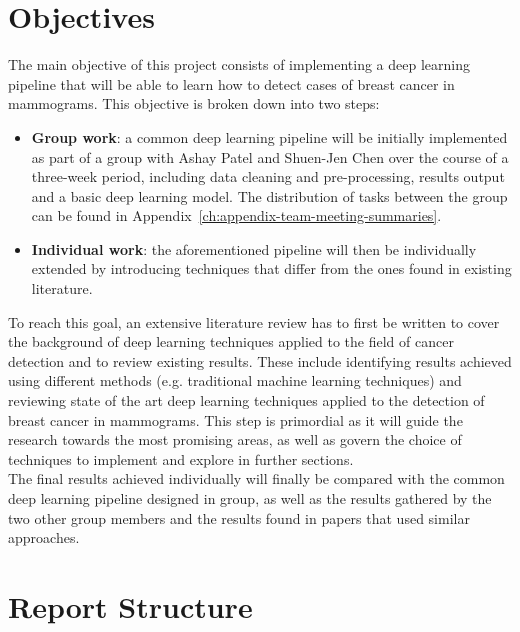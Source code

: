 
\section{Objectives}
\label{sec:introduction-objectives}

The main objective of this project consists of implementing a deep learning pipeline that will be able to learn how to detect cases of breast cancer in mammograms. This objective is broken down into two steps:
\begin{itemize}
    \item \textbf{Group work}: a common deep learning pipeline will be initially implemented as part of a group with Ashay Patel and Shuen-Jen Chen over the course of a three-week period, including data cleaning and pre-processing, results output and a basic deep learning model. The distribution of tasks between the group can be found in Appendix~\ref{ch:appendix-team-meeting-summaries}.
    \item \textbf{Individual work}: the aforementioned pipeline will then be individually extended by introducing techniques that differ from the ones found in existing literature.
\end{itemize}

To reach this goal, an extensive literature review has to first be written to cover the background of deep learning techniques applied to the field of cancer detection and to review existing results. These include identifying results achieved using different methods (e.g. traditional machine learning techniques) and reviewing state of the art deep learning techniques applied to the detection of breast cancer in mammograms. This step is primordial as it will guide the research towards the most promising areas, as well as govern the choice of techniques to implement and explore in further sections.\\

The final results achieved individually will finally be compared with the common deep learning pipeline designed in group, as well as the results gathered by the two other group members and the results found in papers that used similar approaches.


\section{Report Structure}

